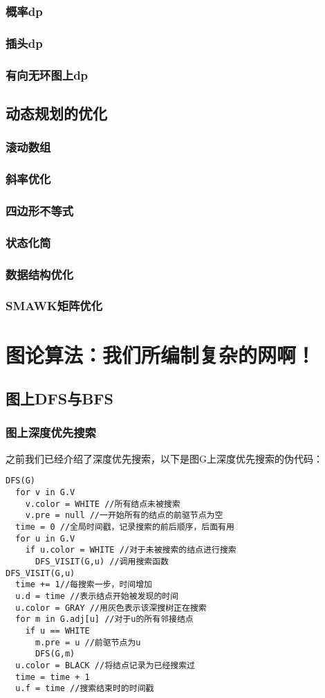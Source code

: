 \documentclass[12pt,a4paper,UTF16]{ctexbook}
\theoremstyle{plain}
\begin{document}
\subsection{概率dp}
\subsection{插头dp}
\subsection{有向无环图上dp}
\section{动态规划的优化}
\subsection{滚动数组}
\subsection{斜率优化}
\subsection{四边形不等式}
\subsection{状态化简}
\subsection{数据结构优化}
\subsection{SMAWK矩阵优化}

\chapter{图论算法：我们所编制复杂的网啊！}
\section{图上DFS与BFS}
\subsection{图上深度优先搜索}
之前我们已经介绍了深度优先搜索，以下是图G上深度优先搜索的伪代码：
\begin{lstlisting}[basicstyle=\ttfamily]
  DFS(G)
  for v in G.V
    v.color = WHITE //所有结点未被搜索
    v.pre = null //一开始所有的结点的前驱节点为空
  time = 0 //全局时间戳，记录搜索的前后顺序，后面有用
  for u in G.V
    if u.color = WHITE //对于未被搜索的结点进行搜索
      DFS_VISIT(G,u) //调用搜索函数
DFS_VISIT(G,u)
  time += 1//每搜索一步，时间增加
  u.d = time //表示结点开始被发现的时间
  u.color = GRAY //用灰色表示该深搜树正在搜索
  for m in G.adj[u] //对于u的所有邻接结点
    if u == WHITE
      m.pre = u //前驱节点为u
      DFS(G,m)
  u.color = BLACK //将结点记录为已经搜索过
  time = time + 1
  u.f = time //搜索结束时的时间戳
\end{lstlisting}
\end{document}
